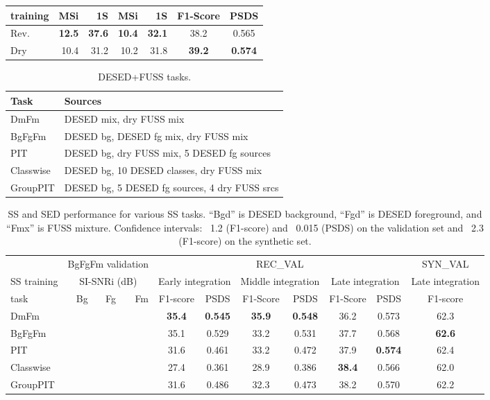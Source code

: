 \documentclass{article}
\begin{document}
\begin{sloppy}
\begin{table}[t]
\begin{tabular}{|l|rrrr||c|c|}
 training & MSi & 1S & MSi & 1S & F1-Score & PSDS \\
  \hline
Rev. & \bf{12.5} & \bf{37.6} & \bf{10.4} & \bf{32.1}
    & 38.2&0.565\\
Dry & 10.4 & 31.2 & 10.2 & 31.8
    &\bf{39.2}&\bf{0.574}\\
\hline
\end{tabular}
\label{tab:ss_sed_fuss}
\end{table}
\begin{table}[t]
    \centering
    \caption{DESED+FUSS tasks.}
    \begin{tabular}{|l|l|}
        \hline
         Task & Sources  \\
         \hline
         DmFm & DESED mix, dry FUSS mix  \\
         BgFgFm & DESED bg, DESED fg mix, dry FUSS mix  \\
         PIT & DESED bg, dry FUSS mix, 5 DESED fg sources \\
         Classwise & DESED bg, 10 DESED classes, dry FUSS mix \\
         GroupPIT & DESED bg, 5 DESED fg sources, 4 dry FUSS srcs \\
         \hline
    \end{tabular}
    \label{tab:desedfuss}
\end{table}



\begin{table*}[t!]
\centering
\caption{SS and SED performance for various SS tasks. ``Bgd'' is DESED background, ``Fgd'' is DESED foreground, and ``Fmx'' is FUSS mixture. Confidence intervals: ~1.2 (F1-score) and ~0.015 (PSDS) on the validation set and ~2.3 (F1-score) on the synthetic set.}
\begin{tabular}{|l|rrr
||c|c|c|c|c|c||c|}
\hline&\multicolumn{3}{c||}{BgFgFm validation}
&\multicolumn{6}{c||}{REC\_VAL}&SYN\_VAL\\
SS training  & \multicolumn{3}{c||}{SI-SNRi (dB)}
& \multicolumn{2}{c|}{Early integration}& \multicolumn{2}{c|}{Middle integration} &  \multicolumn{2}{c||}{Late integration} &Late integration \\
task  & Bg & Fg & Fm
& F1-score & PSDS & F1-Score & PSDS & F1-Score & PSDS& F1-score \\
\hline
DmFm & & & 
    & \bf{35.4}&\bf{0.545}&\bf{35.9}&\bf{0.548}&36.2&0.573&62.3\\
BgFgFm & & & 
    & 35.1&0.529&33.2&0.531&37.7&0.568&\bf{62.6}\\
PIT & & & 
    & 31.6&0.461&33.2&0.472&37.9&\bf{0.574}&62.4\\
Classwise & & & 
    & 27.4&0.361&28.9&0.386&\bf{38.4}&0.566&62.0\\
GroupPIT & & & 
    & 31.6&0.486&32.3&0.473&38.2&0.570&62.2\\
\hline
\end{tabular}
\label{tab:ss_sed_desedfuss}
\end{table*}


\end{sloppy}
\end{document}
